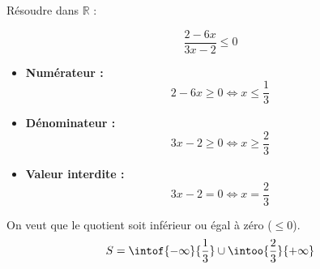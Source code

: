 \begin{methode}
	Résoudre dans $\mathbb{R}$ :

	\[
		\dfrac{2-6x}{3x-2} \le 0
	\]

	\begin{correction}
		\nline
		\begin{itemize}
			\item \textbf{Numérateur :}
			      \[
				      2 - 6x \ge 0 \iff x \le \frac{1}{3}
			      \]
			\item \textbf{Dénominateur :}
			      \[
				      3x - 2 \ge 0 \iff x \ge \frac{2}{3}
			      \]
			\item \textbf{Valeur interdite :}
			      \[
				      3x - 2 = 0 \iff x = \frac{2}{3}
			      \]
		\end{itemize}

		\begin{center}
		\end{center}

		On veut que le quotient soit inférieur ou égal à zéro ($\le 0$).
		\[
			S = \intof{-\infty}{\dfrac{1}{3}} \cup \intoo{\dfrac{2}{3}}{+\infty}
		\]
	\end{correction}
\end{methode}
